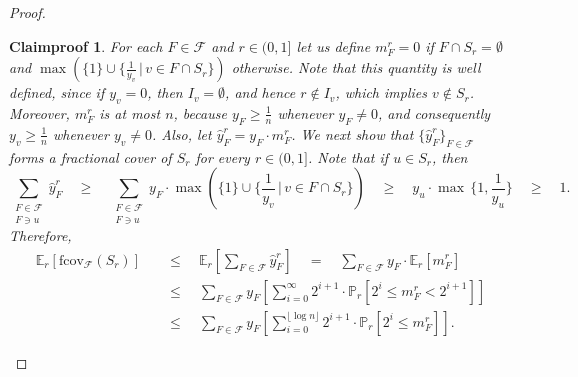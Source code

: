 \documentclass[10pt,a4paper]{amsart}
\newtheorem{claimproof}{Claimproof}
\newcommand{\f}{\mathcal{F}}
\newcommand{\fcov}{\mathrm{fcov}_{\mathcal{F}}}
\begin{document}
\begin{proof}
    
    \begin{claimproof}
        For each $F\in\f$ and $r\in(0,1]$ let us define $m^r_F = 0$ if $F \cap S_r = \emptyset$ and $\max\left( \{1\} \cup \{ \frac{1}{y_v} \, |\, v \in F \cap S_r \} \right)$ otherwise. Note that this quantity is well defined, since if $y_v = 0$, then $I_v = \emptyset$, and hence $r \notin I_v$, which implies $v \notin S_r$. Moreover, $m^r_F$ is at most $n$, because $y_F \geq \frac{1}{n}$ whenever $y_F \neq 0$, and consequently $y_v \geq \frac{1}{n}$ whenever $y_v \neq 0$. Also, let $\hat{y}_F^r = y_F \cdot m^r_F$. 
        We next show that $\{\hat{y}_F^r\}_{F \in \f}$ forms a fractional cover of $S_r$ for every $r \in (0, 1]$.
        Note that if $u \in S_r$, then
        $$
        \sum_{\substack{F \in \f\\ F \ni u}} \hat{y}_F^r \quad  
        \geq \quad \sum_{\substack{F \in \f\\ F \ni u}} y_F \cdot \max\left( \{1\} \cup \{ \frac{1}{y_v} \, |\, v \in F \cap S_r \} \right) \quad 
        \geq \quad y_u \cdot \max\, \{1, \frac{1}{y_u}\} \quad 
        \geq \quad 1.
        $$ 
        Therefore, 
        \begin{align}\label{eq:expectaion_A-B_separator}
            \nonumber \mathbb{E}_r[\fcov(S_r)] \quad
            &\leq \quad \mathbb{E}_r\left[\sum_{F \in \f} \hat{y}_F^r\right]\quad = \quad \sum_{F \in \f} y_F \cdot \mathbb{E}_r[m_F^r]\\
            \nonumber &\leq \quad \sum_{F \in \f} y_F \left[ \sum_{i = 0}^{\infty} 2^{i+1} \cdot \mathbb{P}_r[2^i \leq m_F^r < 2^{i+1}] \right]\\
            &\leq \quad \sum_{F \in \f} y_F \left[ \sum_{i = 0}^{\lfloor \log n \rfloor} 2^{i+1} \cdot \mathbb{P}_r[2^i \leq m_F^r] \right].
        \end{align} 
        

\end{claimproof}
\end{proof}
\end{document}
